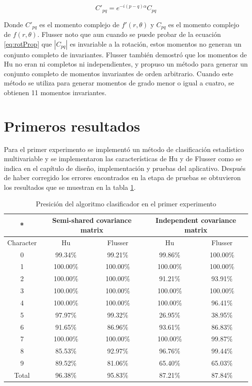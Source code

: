 \documentclass[a4paper, 11pt, oneside]{report}
\begin{document}
\begin{equation}\label{eq:rotProp}
	C'_{pq} = e^{-i(p-q)\alpha}C_{pq}
\end{equation}

Donde $C'_{pq}$ es el momento complejo de $f'(r,\theta)$ y $C_{pq}$ es el momento complejo de $f(r,\theta)$. Flusser noto \cite{flusser99} que aun cuando se puede probar de la ecuación \ref{eq:rotProp} que $|C_{pq}|$ es invariable a la rotación, estos momentos no generan un conjunto completo de invariantes. Flusser también demostró que los momentos de Hu no eran ni completos ni independientes, y propuso un método para generar un conjunto completo de momentos invariantes de orden arbitrario. Cuando este método se utiliza para generar momentos de grado menor o igual a cuatro, se obtienen 11 momentos invariantes.

\section{Primeros resultados}
Para el primer experimento se implementó un método de clasificación estadístico multivariable y se implementaron las características de Hu y de Flusser como se indica en el capítulo de diseño, implementación y pruebas del aplicativo. Después de haber corregido los errores encontrados en la etapa de pruebas se obtuvieron los resultados que se muestran en la tabla \ref{tb:exp1}.
	\begin{table}
	\begin{center}
	\begin{tabular}{|c|c|c|c|c|}
		\hline
		* & \multicolumn{2}{|c|}{Semi-shared covariance matrix} &
			\multicolumn{2}{|c|}{Independent covariance matrix} \\
		\hline
		Character & Hu & Flusser & Hu & Flusser \\
		\hline
		0 & 99.34\% & 99.21\% & 99.86\% & 100.00\% \\
		1 &	100.00\% & 100.00\% & 100.00\% & 100.00\% \\
		2 &	100.00\% & 100.00\% & 91.21\% & 93.91\% \\
		3 &	100.00\% & 100.00\% & 100.00\% & 100.00\% \\
		4 &	100.00\% & 100.00\%	& 100.00\% & 96.41\% \\		
		5 & 97.97\% & 99.32\% & 26.95\% & 38.95\% \\ 
		6 & 91.65\% & 86.96\% & 93.61\% & 86.83\% \\
		7 & 100.00\% & 100.00\% & 100.00\% & 99.87\% \\
		8 & 85.53\% & 92.97\% & 96.76\% & 99.44\% \\
		9 &	89.52\% & 81.06\% & 65.40\% & 65.03\% \\
		\hline
		Total & 96.38\% & 95.83\% & 87.21\% & 87.84\% \\
		\hline
	\end{tabular}
	\end{center}
	\caption{Presición del algoritmo clasificador en el primer experimento}	
	\label{tb:exp1}
	\end{table}
\end{document}
